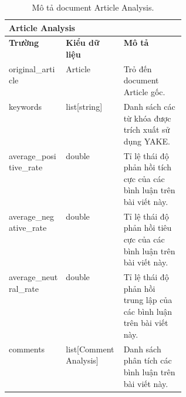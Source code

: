 \begin{table}[ht!]
    \centering
\begin{tabular}{|llp{0.35\linewidth}|}
\hline
\multicolumn{3}{|l|}{\textbf{Article Analysis}}                                                                                                            \\ \hline
\multicolumn{1}{|l|}{\textbf{Trường}}         & \multicolumn{1}{l|}{\textbf{Kiểu dữ liệu}}        & \textbf{Mô   tả}                                       \\ \hline
\multicolumn{1}{|l|}{original\_article}       & \multicolumn{1}{l|}{Article}                      & Trỏ   đến document Article gốc.                        \\ \hline
\multicolumn{1}{|l|}{keywords}                & \multicolumn{1}{l|}{list{[}string{]}}             & Danh   sách các từ khóa được trích xuất sử dụng YAKE.  \\ \hline
\multicolumn{1}{|l|}{average\_positive\_rate} & \multicolumn{1}{l|}{double}                       & Tỉ   lệ thái độ phản hồi tích cực của các bình luận trên bài viết này.   \\ \hline
\multicolumn{1}{|l|}{average\_negative\_rate} & \multicolumn{1}{l|}{double}                       & Tỉ   lệ thái độ phản hồi tiêu cực của các bình luận trên bài viết này.   \\ \hline
\multicolumn{1}{|l|}{average\_neutral\_rate}  & \multicolumn{1}{l|}{double}                       & Tỉ   lệ thái độ phản hồi trung lập của các bình luận trên bài viết này.  \\ \hline
\multicolumn{1}{|l|}{comments}                & \multicolumn{1}{l|}{list{[}Comment   Analysis{]}} & Danh   sách phân tích các bình luận trên bài viết này. \\ \hline
\end{tabular}
    \caption{Mô tả document Article Analysis.}
    \label{table:schema-article-analysis}
\end{table}

